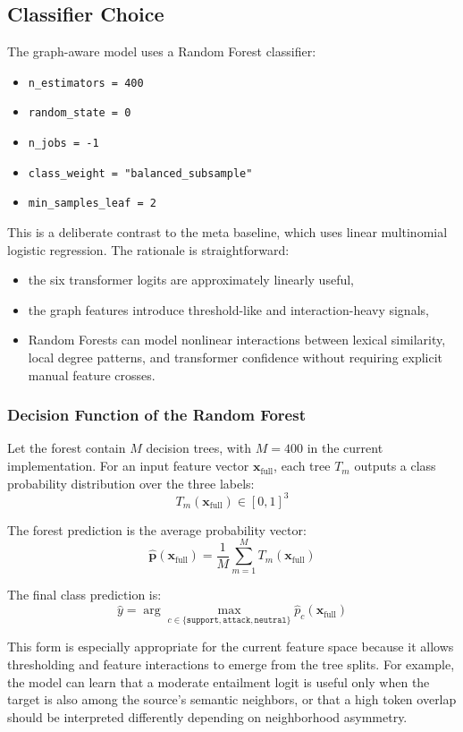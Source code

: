 \documentclass[11pt,a4paper]{article}
\begin{document}
\subsection{Classifier Choice}
The graph-aware model uses a Random Forest classifier:
\begin{itemize}[leftmargin=1.5em]
  \item \texttt{n\_estimators = 400}
  \item \texttt{random\_state = 0}
  \item \texttt{n\_jobs = -1}
  \item \texttt{class\_weight = "balanced\_subsample"}
  \item \texttt{min\_samples\_leaf = 2}
\end{itemize}

This is a deliberate contrast to the meta baseline, which uses linear multinomial logistic regression. The rationale is straightforward:
\begin{itemize}[leftmargin=1.5em]
  \item the six transformer logits are approximately linearly useful,
  \item the graph features introduce threshold-like and interaction-heavy signals,
  \item Random Forests can model nonlinear interactions between lexical similarity, local degree patterns, and transformer confidence without requiring explicit manual feature crosses.
\end{itemize}

\subsubsection{Decision Function of the Random Forest}
Let the forest contain \(M\) decision trees, with \(M=400\) in the current implementation. For an input feature vector \(\mathbf{x}_{\text{full}}\), each tree \(T_m\) outputs a class probability distribution over the three labels:
\[
T_m(\mathbf{x}_{\text{full}}) \in [0,1]^3
\]

The forest prediction is the average probability vector:
\[
\hat{\mathbf{p}}(\mathbf{x}_{\text{full}})
=
\frac{1}{M}\sum_{m=1}^{M} T_m(\mathbf{x}_{\text{full}})
\]

The final class prediction is:
\[
\hat{y}
=
\arg\max_{c \in \{\texttt{support}, \texttt{attack}, \texttt{neutral}\}}
\hat{p}_c(\mathbf{x}_{\text{full}})
\]

This form is especially appropriate for the current feature space because it allows thresholding and feature interactions to emerge from the tree splits. For example, the model can learn that a moderate entailment logit is useful only when the target is also among the source's semantic neighbors, or that a high token overlap should be interpreted differently depending on neighborhood asymmetry.
\end{document}
